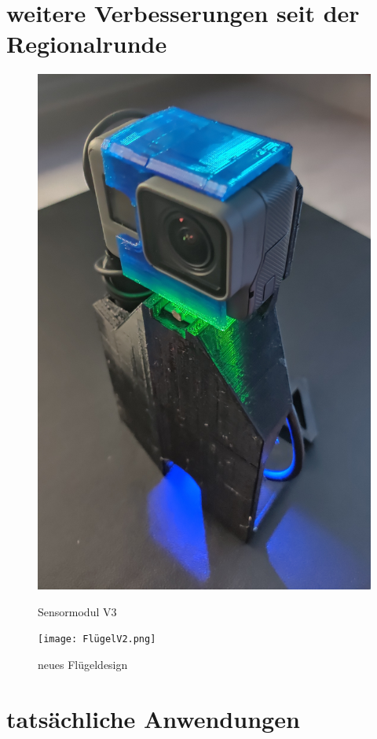 \documentclass[11pt]{article}
\begin{document}
\section{weitere Verbesserungen seit der Regionalrunde}
\begingroup
\begin{figure}
\centering
  \includegraphics[angle=0,width=\linewidth]{sensaris.jpg}
  \caption{Sensormodul V3}
  \vspace{0.5cm}
  {\setlength{\belowcaptionskip}{-30pt}
    \texttt{[image: FlügelV2.png]}
    \caption{neues Flügeldesign}
  }
\end{figure}
\weitereVerbesserungen

\section{tatsächliche Anwendungen}
\tatsaechlicheAnwendungen
\end{document}
